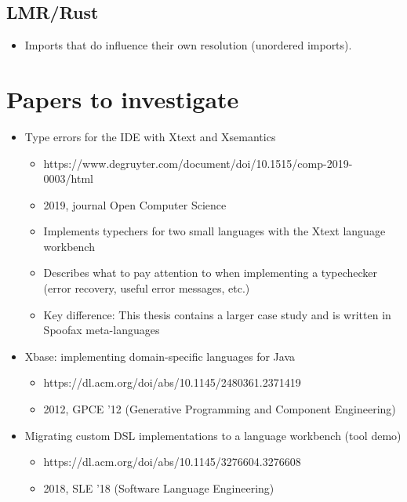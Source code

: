       \subsection{LMR/Rust}

        \begin{itemize}
          \item Imports that do influence their own resolution (unordered imports).
        \end{itemize}

  \section{Papers to investigate}

    \begin{itemize}
      \item Type errors for the IDE with Xtext and Xsemantics
      \begin{itemize}
        \item https://www.degruyter.com/document/doi/10.1515/comp-2019-0003/html
        \item 2019, journal Open Computer Science
        \item Implements typechers for two small languages with the Xtext language workbench
        \item Describes what to pay attention to when implementing a typechecker (error recovery, useful error messages, etc.)
        \item Key difference: This thesis contains a larger case study and is written in Spoofax meta-languages
      \end{itemize}
      \item Xbase: implementing domain-specific languages for Java
      \begin{itemize}
        \item https://dl.acm.org/doi/abs/10.1145/2480361.2371419
        \item 2012, GPCE '12 (Generative Programming and Component Engineering)
      \end{itemize}
      \item Migrating custom DSL implementations to a language workbench (tool demo)
      \begin{itemize}
        \item https://dl.acm.org/doi/abs/10.1145/3276604.3276608
        \item 2018, SLE '18 (Software Language Engineering)
      \end{itemize}

\end{itemize}
